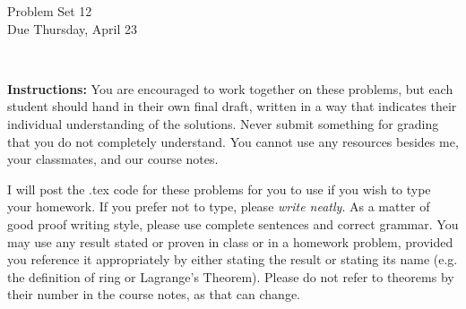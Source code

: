 \documentclass[11pt]{article}
\title{}
\date{\vspace{-0.5in}}
\theoremstyle{definition}
\begin{document}
\thispagestyle{fancy}
\pagestyle{fancy}

\vspace{3em}

\begin{center}
	{\LARGE Problem Set 12 \\}
	Due Thursday, April 23\end{center}

\

\noindent
{\bf Instructions:}
You are encouraged to work together on these problems, but each student should hand in their own final draft, written in a way that indicates their individual understanding of the solutions. Never submit something for grading that you do not completely understand. You cannot use any resources besides me, your classmates, and our course notes.


I will post the .tex code for these problems for you to use if you wish to type your homework. If you prefer not to type, please  {\em write neatly}. As a matter of good proof writing style, please use complete sentences and correct grammar. You may use any result stated or proven in class or in a homework problem, provided you reference it appropriately by either stating the result or stating its name (e.g. the definition of ring or Lagrange's Theorem). Please do not refer to theorems by their number in the course notes, as that can change.
\end{document}
